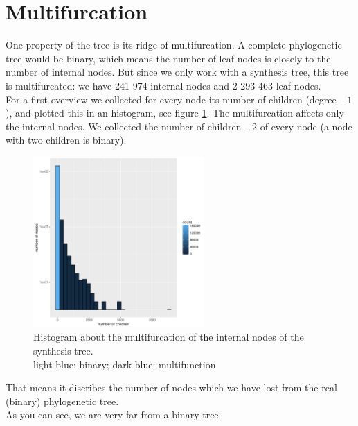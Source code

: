     \section{Multifurcation}\label{sec:ResultsMultifurcation}
      One property of the tree is its ridge of multifurcation. A complete phylogenetic tree would be 
        binary, which means the number of leaf nodes is closely to the number of internal nodes. But 
        since we only work with a synthesis tree, this tree is multifurcated: we have 241 974 internal 
        nodes and 2 293 463 leaf nodes. \\
      For a first overview we collected for every node its number of children (degree $-1$), and plotted
        this in an histogram, see figure \ref{fig:childrenOfNodes}. The multifurcation affects only the
        internal nodes. We collected the number of children $-2$ of every node (a node with two children 
        is binary). 
      \begin{figure}
        \begin{center}
          \includegraphics[trim = 0mm 0mm 30mm 0mm, clip, width=0.58\textwidth]{Figures/multifurc.pdf}
        \end{center}
        \caption{Histogram about the multifurcation of the internal nodes of the synthesis tree. \\ 
          light blue: binary; dark blue: multifunction}
        \label{fig:childrenOfNodes}
      \end{figure}
      That means it discribes the number of nodes which we have lost from the real (binary) 
      phylogenetic tree. \\
      As you can see, we are very far from a binary tree.
    
